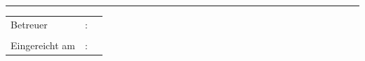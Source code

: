 \begin{titlepage}
\begin{addmargin}[-1cm]{-3cm}
\begin{center}
{{			\hrule

			\vspace{0.7cm}

		\begin{addmargin}[3.3cm]{0cm}
			{\fontsize{12pt}{12} \selectfont%
				\begin{tabular}{lcl}
					Betreuer &:& \myProf\\[0.5ex]
					&& \mySupervisor\\[0.5ex]
					Eingereicht am &:& \myDate
				\end{tabular}
			}
		\end{addmargin}
		}
	}
									
\end{center}
\end{addmargin} 
\end{titlepage}

\newpage
\normalsize
\chead[]{}